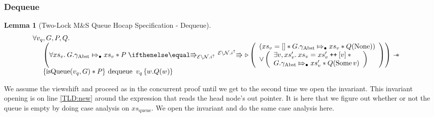 \documentclass[a4paper, 10pt]{report}
\theoremstyle{definition}
\newtheorem{lemma}[theorem]{Lemma}
\newcommand{\dequeue}{\operatorname{dequeue}}
\newcommand{\msq}{M\&S Queue}
\newcommand{\tlmsq}{Two-Lock \msq{}}
\newcommand{\isqueue}{\operatorname{isQueue}}
\newcommand{\vq}{v_q}
\newcommand{\xsqueue}{xs_{\mathrm{queue}}}
\newcommand{\nodeval}{\valB}
\newcommand{\absvalue}{\val}
\newcommand{\absvalueList}{xs_v}
\newcommand{\Qg}{G}
\newcommand{\gabst}{\gname_{\mathrm{Abst}}}
\newcommand\catenate{\mathbin{\text{\ttfamily\upshape ++}}}
\newcommand{\Nl}{\ensuremath{\mathcal{N}}}
\newcommand{\abstractstateauth}[2]{#1 \Mapsto_{\bullet} #2}
\newcommand{\tlhocapspecdeqVSGen}[6]{
  \abstractstateauth{#1.\gabst}{#4} \star{} #2 \vs[\mask\setminus\Nl.i^\uparrow] \later
  \left(
    \begin{array}{l}
      (#4 = [] \star{} \abstractstateauth{#1.\gabst}{#4} \star{} #3(\None))\\
      \lor{}
      \left(
        \begin{array}{l}
          \Exists #5, #6 . #4 = #6 \catenate [#5] \star{}\\
          \abstractstateauth{#1.\gabst}{#6} \star{} #3(\Some{#5})
        \end{array}
        \right)
    \end{array}
  \right)
}
\newcommand{\tlhocapspecdeqVS}[4]{\tlhocapspecdeqVSGen{#1}{#2}{#3}{#4}{\absvalue}{#4'}}
\newcommand{\tlhocapspecdeqHT}[4]{\hoare{\isqueue(#1, #2) \star{} #3}{\dequeue \ #1}{\nodeval . #4(\nodeval)}}
\newcommand{\tlhocapspecdeqGen}[5]{\begin{array}[t]{l}
  \All #1, #2, #3, #4.\\
  \begin{array}[t]{l}
  \quad\left(\All #5 . \tlhocapspecdeqVS{#2}{#3}{#4}{#5} \right) \wand\\
  \quad\tlhocapspecdeqHT{#1}{#2}{#3}{#4}
  \end{array}
\end{array}}
\newcommand{\tlhocapspecdeq}{\tlhocapspecdeqGen{\vq}{\Qg}{P}{Q}{\absvalueList}}
\begin{document}
\subsubsection{Dequeue}
\begin{lemma}[\tlmsq{} Hocap Specification - Dequeue]\label{TLMSQ:spec:hocap:dequeue}
  \begin{equation*}
    \tlhocapspecdeq
  \end{equation*}
\end{lemma}
We assume the viewshift and proceed as in the concurrent proof until we get to the second time we open the invariant. This invariant opening is on line \ref{TLD:new} around the expression that reads the head node's out pointer. It is here that we figure out whether or not the queue is empty by doing case analysis on $\xsqueue$. We open the invariant and do the same case analysis here.
\end{document}
